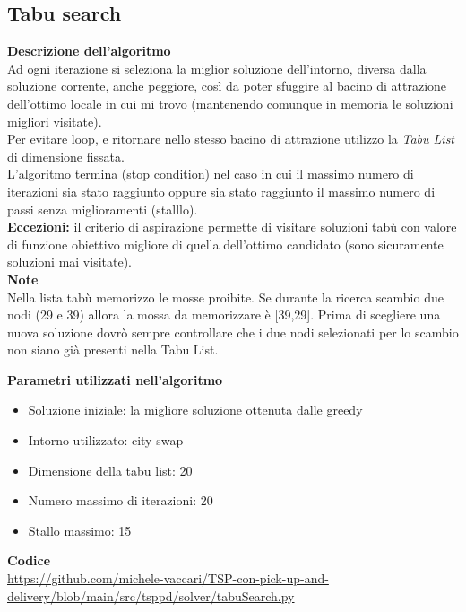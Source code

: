 \documentclass[9pt]{beamer}
\begin{document}
\subsection{Tabu search}
\begin{frame}{\subsecname}

	\textbf{Descrizione dell'algoritmo} \\
	Ad ogni iterazione si seleziona la miglior soluzione dell’intorno, diversa dalla soluzione corrente, anche peggiore, così da poter sfuggire al bacino di attrazione dell’ottimo locale in cui mi trovo (mantenendo comunque in memoria le soluzioni migliori visitate). \\
	Per evitare loop, e ritornare nello stesso bacino di attrazione utilizzo la \emph{Tabu List} di dimensione fissata. \\
	L’algoritmo termina (stop condition) nel caso in cui il massimo numero di iterazioni sia stato raggiunto oppure sia stato raggiunto il massimo numero di passi senza miglioramenti (stalllo). \\
	\textbf{Eccezioni:} il criterio di aspirazione permette di visitare soluzioni tabù con valore di funzione obiettivo migliore di quella dell’ottimo candidato (sono sicuramente soluzioni mai visitate). \\

\framebreak
	\textbf{Note} \\
	Nella lista tabù memorizzo le mosse proibite. Se durante la ricerca scambio due nodi (29 e 39) allora la mossa da memorizzare è [39,29].
Prima di scegliere una nuova soluzione dovrò sempre controllare che i due nodi selezionati per lo scambio non siano già presenti nella Tabu List.

	\textbf{Parametri utilizzati nell'algoritmo}
	\begin{itemize}
		\item
		Soluzione iniziale: la migliore soluzione ottenuta dalle greedy
		\item
		Intorno utilizzato: city swap
		\item
		Dimensione della tabu list: 20
		\item
		Numero massimo di iterazioni: 20
		\item
		Stallo massimo: 15
	\end{itemize}

	\textbf{Codice} \\
	\href{https://github.com/michele-vaccari/TSP-con-pick-up-and-delivery/blob/main/src/tsppd/solver/tabuSearch.py}{https://github.com/michele-vaccari/TSP-con-pick-up-and-delivery/blob/main/src/tsppd/solver/tabuSearch.py}


\end{frame}
\end{document}
